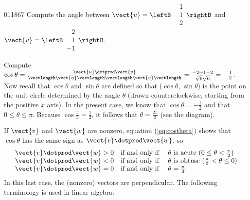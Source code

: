 \begin{example}{}{011867}
Compute the angle between 
$\vect{u} = \leftB
\begin{array}{r}
-1 \\
1 \\
2
\end{array}
\rightB$ 
and 
$\vect{v} = \leftB
\begin{array}{r}
2 \\
1 \\
-1
\end{array}
\rightB$.


\begin{wrapfigure}[7]{l}{5cm}
\vspace*{-2em}
\centering

\end{wrapfigure}

\setlength{\rightskip}{0pt plus 200pt}
\begin{solution}
 Compute $\cos\theta = \frac{\vect{u} \dotprod \vect{v}}{\vectlength \vect{u} \vectlength \vectlength \vect{v} \vectlength} = \frac{-2 + 1 -2}{\sqrt{6}\sqrt{6}} = -\frac{1}{2}$. Now recall that $\cos\theta$ and $\sin \theta$ are defined so that ($\cos \theta$, $\sin \theta$) is the point on the unit circle determined by the angle $\theta$ (drawn counterclockwise, starting from the positive $x$ axis). In the present case, we know that $\cos \theta = -\frac{1}{2}$ and that $0 \leq \theta \leq \pi$. Because $\cos\frac{\pi}{3} = \frac{1}{2}$, it follows that $\theta = \frac{2\pi}{3}$ (see the diagram).
\vspace{2em}
\end{solution}
\end{example}

If $\vect{v}$ and $\vect{w}$ are nonzero, equation (\ref{eq:costheta}) shows that $\cos \theta$ has the same sign as $\vect{v} \dotprod \vect{w}$, so
\begin{equation*}
\begin{array}{lll}
\vect{v} \dotprod \vect{w} > 0 & \mbox{if and only if } & \theta \mbox{ is acute } (0 \leq \theta < \frac{\pi}{2}) \\
\vect{v} \dotprod \vect{w} < 0 & \mbox{if and only if } & \theta \mbox{ is obtuse } (\frac{\pi}{2} < \theta \leq 0) \\
\vect{v} \dotprod \vect{w} = 0 & \mbox{if and only if } & \theta = \frac{\pi}{2}
\end{array}
\end{equation*}
In this last case, the (nonzero) vectors are perpendicular. The following terminology is used in linear algebra:


